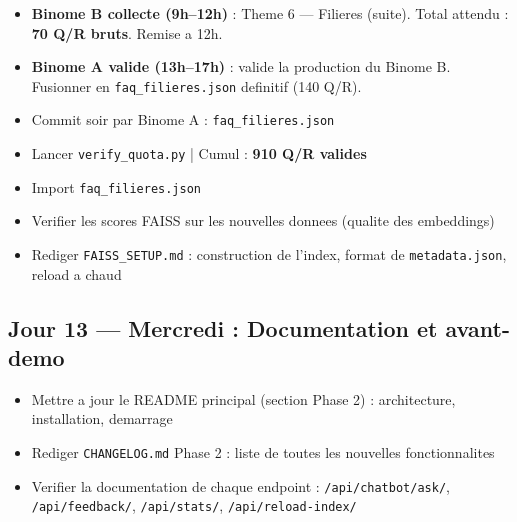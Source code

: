 \documentclass[11pt,a4paper]{article}
\begin{document}
\begin{databox}[Data --- J12]
\begin{itemize}
    \item[$\square$] \textbf{Binome B collecte (9h--12h)} : Theme 6 --- Filieres (suite). Total attendu : \textbf{70 Q/R bruts}. Remise a 12h.
    \item[$\square$] \textbf{Binome A valide (13h--17h)} : valide la production du Binome B. Fusionner en \texttt{faq\_filieres.json} definitif (140 Q/R).
    \item[$\square$] Commit soir par Binome A : \texttt{faq\_filieres.json}
    \item[$\square$] Lancer \texttt{verify\_quota.py} | Cumul : \textbf{910 Q/R valides}
\end{itemize}
\end{databox}

\begin{dbbox}
\begin{itemize}
    \item[$\square$] Import \texttt{faq\_filieres.json}
    \item[$\square$] Verifier les scores FAISS sur les nouvelles donnees (qualite des embeddings)
    \item[$\square$] Rediger \texttt{FAISS\_SETUP.md} : construction de l'index, format de \texttt{metadata.json}, reload a chaud
\end{itemize}
\end{dbbox}

\subsection{Jour 13 --- Mercredi : Documentation et avant-demo}

\begin{ragbox}[Backend --- J13]
\begin{itemize}
    \item[$\square$] Mettre a jour le README principal (section Phase 2) : architecture, installation, demarrage
    \item[$\square$] Rediger \texttt{CHANGELOG.md} Phase 2 : liste de toutes les nouvelles fonctionnalites
    \item[$\square$] Verifier la documentation de chaque endpoint : \texttt{/api/chatbot/ask/}, \texttt{/api/feedback/}, \texttt{/api/stats/}, \texttt{/api/reload-index/}
\end{itemize}
\end{ragbox}
\end{document}
